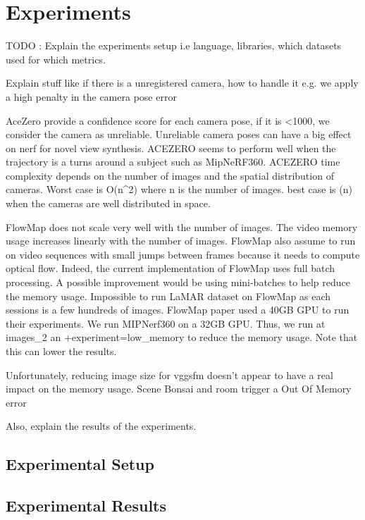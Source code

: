 \chapter{Experiments}\label{chap:experiments}

TODO : 
Explain the experiments setup i.e language, libraries, which datasets used for which metrics. 

Explain stuff like if there is a unregistered camera, how to handle it e.g. we apply a high penalty in the camera pose error

AceZero provide a confidence score for each camera pose, if it is <1000, we consider the camera as unreliable.
Unreliable camera poses can have a big effect on nerf for novel view synthesis.
ACEZERO seems to perform well when the trajectory is a turns around a subject such as MipNeRF360.
ACEZERO time complexity depends on the number of images and the spatial distribution of cameras. Worst case is O(n^2) where n is the number of images. best case is \Omega(n) when the cameras are well distributed in space.

FlowMap does not scale very well with the number of images. The video memory usage increases linearly with the number of images.
FlowMap also assume to run on video sequences with small jumps between frames because it needs to compute optical flow.
Indeed, the current implementation of FlowMap uses full batch processing. A possible improvement would be using mini-batches to help reduce the memory usage.
Impossible to run LaMAR dataset on FlowMap as each sessions is a few hundreds of images.
FlowMap paper used a 40GB GPU to run their experiments. We run MIPNerf360 on a 32GB GPU. Thus, we run at images_2 an +experiment=low_memory to reduce the memory usage. Note that this can lower the results.


Unfortunately, reducing image size for vggsfm doesn't appear to have a real impact on the memory usage. Scene Bonsai and room trigger a Out Of Memory error


Also, explain the results of the experiments.

\section{Experimental Setup}\label{sec:experimental-setup}
\lipsum[1-2]

\section{Experimental Results}\label{sec:experimental-results}
\lipsum[3-4]